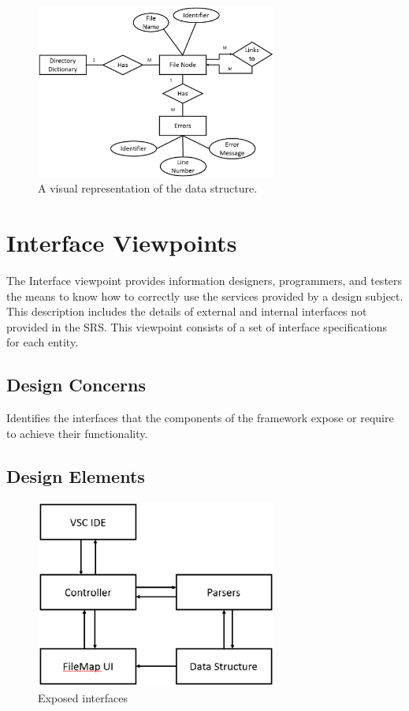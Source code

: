 \documentclass[letterpaper,10pt,titlepage,draftclsnofoot,onecolumn,onesided] {IEEEtran}
\begin{document}
\begin{figure}
	\includegraphics[width=300px]{InformationERDEPS.eps}
	\caption{A visual representation of the data structure.}
\end{figure}
				
\section{Interface Viewpoints}
The Interface viewpoint provides information designers, programmers, and testers the means to know how
to correctly use the services provided by a design subject. This description includes the details of external
and internal interfaces not provided in the SRS. This viewpoint consists of a set of interface specifications
for each entity. 
\subsection{Design Concerns}
Identifies the interfaces that the components of the framework expose or require to achieve their
functionality. 
\subsection{Design Elements}

\begin{figure}
\includegraphics[width=300px]{InterfaceUMLEPS.eps}
	\caption{Exposed interfaces}
\end{figure}
\end{document}
